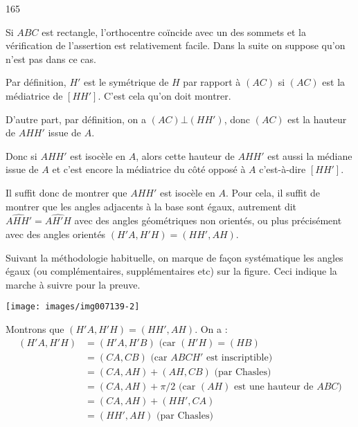 \begin{Soln}{165}

Si $ABC$ est rectangle, l'orthocentre coïncide avec un des sommets et la vérification de l'assertion est relativement facile. Dans la suite on suppose qu'on n'est pas dans ce cas.

Par définition, $H'$ est le symétrique de $H$ par rapport à $(AC)$ si $(AC)$ est la médiatrice de $[HH']$. C'est cela qu'on doit montrer.



D'autre part, par définition, on a $(AC) \bot (HH')$, donc $(AC)$ est la hauteur de $AHH'$ issue de $A$.

Donc si $AHH'$ est isocèle en $A$, alors cette hauteur de $AHH'$  est aussi la médiane issue de $A$ et c'est encore la médiatrice du côté opposé à $A$ c'est-à-dire $[HH']$.

Il suffit donc de montrer que $AHH'$ est isocèle en $A$. Pour cela, il suffit de montrer que les angles adjacents à la base sont égaux, autrement dit $\widehat{AHH'} = \widehat{AH'H}$ avec des angles géométriques non orientés, ou plus précisément avec des angles orientés $(H'A,H'H)=(HH',AH)$.

Suivant la méthodologie habituelle, on marque de façon systématique les angles égaux (ou complémentaires, supplémentaires etc) sur la figure. Ceci indique la marche à suivre pour la preuve.


\begin{center}
\texttt{[image: images/img007139-2]}
\end{center}

Montrons que $(H'A,H'H)=(HH',AH)$. On a :
\begin{align*}
(H'A,H'H) &= (H'A,H'B) \text{ (car $(H'H)=(HB)$}\\
&= (CA,CB) \text{ (car $ABCH'$ est inscriptible)}\\
&= (CA,AH)+(AH,CB) \text{ (par Chasles)}\\
&= (CA,AH)+\pi/2 \text{ (car $(AH)$ est une hauteur de $ABC$)}\\
&= (CA,AH)+(HH',CA)\\
&= (HH',AH) \text{ (par Chasles)}
\end{align*}


\end{Soln}
